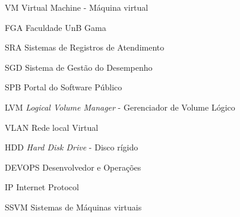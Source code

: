 \begin{siglas}
  \item[VM] Virtual Machine - Máquina virtual
  \item[FGA] Faculdade UnB Gama
  \item[SRA] Sistemas de Registros de Atendimento
  \item[SGD] Sistema de Gestão do Desempenho
  \item[SPB] Portal do Software Público
  \item[LVM] \textit{Logical Volume Manager} - Gerenciador de Volume Lógico
  \item[VLAN] Rede local Virtual
  \item[HDD] \textit{Hard Disk Drive} - Disco rígido
  \item[DEVOPS] Desenvolvedor e Operações
  \item[IP] Internet Protocol
  \item [SSVM] Sistemas de Máquinas virtuais
\end{siglas}

